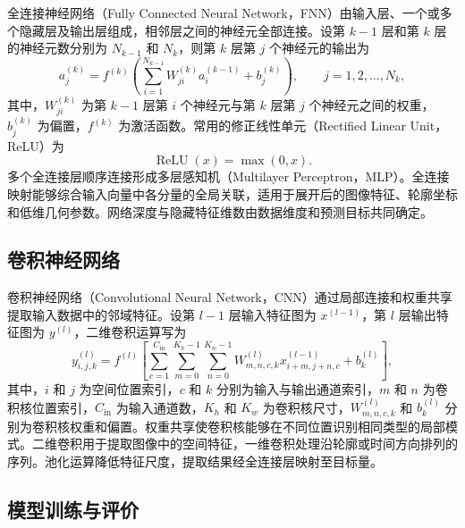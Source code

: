 全连接神经网络（Fully Connected Neural Network，FNN）由输入层、一个或多个隐藏层及输出层组成，相邻层之间的神经元全部连接。设第 $k-1$ 层和第 $k$ 层的神经元数分别为 $N_{k-1}$ 和 $N_k$，则第 $k$ 层第 $j$ 个神经元的输出为
\begin{equation}
a_j^{(k)}
=
f^{(k)}
\left(
\sum_{i=1}^{N_{k-1}}
W_{ji}^{(k)}a_i^{(k-1)}
+
b_j^{(k)}
\right),
\qquad j=1,2,\ldots,N_k,
\label{eq:ch2_fully_connected_layer}
\end{equation}
其中，$W_{ji}^{(k)}$ 为第 $k-1$ 层第 $i$ 个神经元与第 $k$ 层第 $j$ 个神经元之间的权重，$b_j^{(k)}$ 为偏置，$f^{(k)}$ 为激活函数。常用的修正线性单元（Rectified Linear Unit，ReLU）为
\begin{equation}
\operatorname{ReLU}(x)
=
\max(0,x).
\label{eq:ch2_relu}
\end{equation}
多个全连接层顺序连接形成多层感知机（Multilayer Perceptron，MLP）。全连接映射能够综合输入向量中各分量的全局关联，适用于展开后的图像特征、轮廓坐标和低维几何参数。网络深度与隐藏特征维数由数据维度和预测目标共同确定\cite{lecun2015deeplearning}。

\subsection{卷积神经网络}
\label{subsec:ch2_cnn}

卷积神经网络（Convolutional Neural Network，CNN）通过局部连接和权重共享提取输入数据中的邻域特征。设第 $l-1$ 层输入特征图为 $x^{(l-1)}$，第 $l$ 层输出特征图为 $y^{(l)}$，二维卷积运算写为
\begin{equation}
y_{i,j,k}^{(l)}
=
f^{(l)}
\left[
\sum_{c=1}^{C_{\mathrm{in}}}
\sum_{m=0}^{K_h-1}
\sum_{n=0}^{K_w-1}
W_{m,n,c,k}^{(l)}
x_{i+m,j+n,c}^{(l-1)}
+
b_k^{(l)}
\right],
\label{eq:ch2_convolution}
\end{equation}
其中，$i$ 和 $j$ 为空间位置索引，$c$ 和 $k$ 分别为输入与输出通道索引，$m$ 和 $n$ 为卷积核位置索引，$C_{\mathrm{in}}$ 为输入通道数，$K_h$ 和 $K_w$ 为卷积核尺寸，$W_{m,n,c,k}^{(l)}$ 和 $b_k^{(l)}$ 分别为卷积核权重和偏置。权重共享使卷积核能够在不同位置识别相同类型的局部模式。二维卷积用于提取图像中的空间特征，一维卷积处理沿轮廓或时间方向排列的序列。池化运算降低特征尺度，提取结果经全连接层映射至目标量\cite{krizhevsky2012imagenet,lecun2015deeplearning}。

\subsection{模型训练与评价}
\label{subsec:ch2_training}

